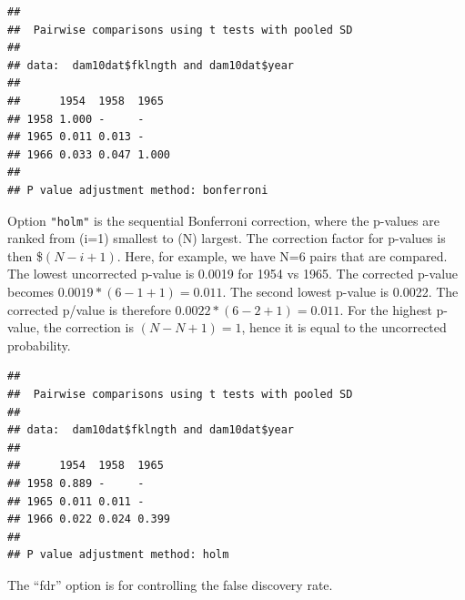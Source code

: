 \documentclass[
  12pt,
]{book}
\newenvironment{Shaded}{\begin{snugshade}}{\end{snugshade}}
\newcommand{\DataTypeTok}[1]{\textcolor[rgb]{0.13,0.29,0.53}{#1}}
\newcommand{\KeywordTok}[1]{\textcolor[rgb]{0.13,0.29,0.53}{\textbf{#1}}}
\newcommand{\NormalTok}[1]{#1}
\newcommand{\OperatorTok}[1]{\textcolor[rgb]{0.81,0.36,0.00}{\textbf{#1}}}
\newcommand{\StringTok}[1]{\textcolor[rgb]{0.31,0.60,0.02}{#1}}
\begin{document}
\begin{Shaded}
\end{Shaded}

\begin{verbatim}
## 
##  Pairwise comparisons using t tests with pooled SD 
## 
## data:  dam10dat$fklngth and dam10dat$year 
## 
##      1954  1958  1965 
## 1958 1.000 -     -    
## 1965 0.011 0.013 -    
## 1966 0.033 0.047 1.000
## 
## P value adjustment method: bonferroni
\end{verbatim}

Option \texttt{"holm"} is the sequential Bonferroni correction, where the p-values are ranked from (i=1) smallest to (N) largest. The correction factor for p-values is then \$\((N-i+1)\). Here, for example, we have N=6 pairs that are compared. The lowest uncorrected p-value is 0.0019 for 1954 vs 1965. The corrected p-value becomes \(0.0019*(6-1+1)= 0.011\). The second lowest p-value is 0.0022. The corrected p/value is therefore \(0.0022*(6-2+1)=0.011\). For the highest p-value, the correction is \((N-N+1)=1\), hence it is equal to the uncorrected probability.

\begin{Shaded}
\end{Shaded}

\begin{verbatim}
## 
##  Pairwise comparisons using t tests with pooled SD 
## 
## data:  dam10dat$fklngth and dam10dat$year 
## 
##      1954  1958  1965 
## 1958 0.889 -     -    
## 1965 0.011 0.011 -    
## 1966 0.022 0.024 0.399
## 
## P value adjustment method: holm
\end{verbatim}

The ``fdr'' option is for controlling the false discovery rate.

\begin{Shaded}
\end{Shaded}
\end{document}
